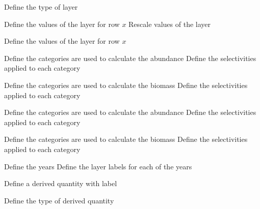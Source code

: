  {Define the type of layer}
\par\textbf{}\par
{} {Define the values of the layer for row $x$}
 {Rescale values of the layer}
\par\textbf{}\par
{} {Define the values of the layer for row $x$}
\par\textbf{}\par
\par\textbf{}\par
{} {Define the categories are used to calculate the abundance}
 {Define the selectivities applied to each category}
\par\textbf{}\par
{} {Define the categories are used to calculate the biomass}
 {Define the selectivities applied to each category}
\par\textbf{}\par
{} {Define the categories are used to calculate the abundance}
 {Define the selectivities applied to each category}
\par\textbf{}\par
{} {Define the categories are used to calculate the biomass}
 {Define the selectivities applied to each category}
\par\textbf{}\par
{} {Define the years}
 {Define the layer labels for each of the years}
\par {} {Define a derived quantity with label}\par
{} {Define the type of derived quantity}
\par\textbf{}\par
